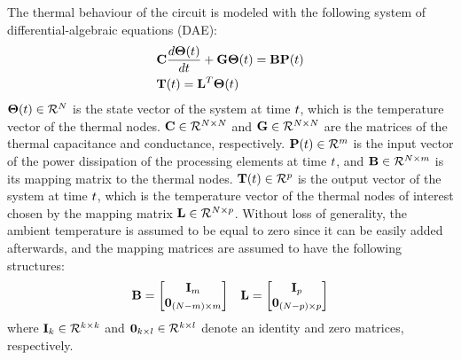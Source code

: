 The thermal behaviour of the circuit is modeled with the following system of differential-algebraic equations (DAE):
\begin{align}
  & \mCap \frac{d\vTemp(\time)}{d\time} + \mCond \vTemp(\time) = \mIn \vPower(\time)  \equlabel{fourier} \\
  & \vOutTemp(\time) = \mOut^T \vTemp(\time) \nonumber
\end{align}
$\mathbf{\Theta}(t) \in \mathcal{R}^{N}$ is the state vector of the system at time $t$, which is the temperature vector of the thermal nodes. $\mathbf{C} \in \mathcal{R}^{N \times N}$ and $\mathbf{G} \in \mathcal{R}^{N \times N}$ are the matrices of the thermal capacitance and conductance, respectively. $\mathbf{P}(t) \in \mathcal{R}^{m}$ is the input vector of the power dissipation of the processing elements at time $t$, and $\mathbf{B} \in \mathcal{R}^{N \times m}$ is its mapping matrix to the thermal nodes. $\mathbf{T}(t) \in \mathcal{R}^{p}$ is the output vector of the system at time $t$, which is the temperature vector of the thermal nodes of interest chosen by the mapping matrix $\mathbf{L} \in \mathcal{R}^{N \times p}$. Without loss of generality, the ambient temperature is assumed to be equal to zero since it can be easily added afterwards, and the mapping matrices are assumed to have the following structures:
\[
  \begin{array}{lr}
  \mathbf{B} = \begin{bmatrix}
    \mathbf{I}_m \\
    \mathbf{0}_{(N - m) \times m}
  \end{bmatrix} &
  \mathbf{L} = \begin{bmatrix}
    \mathbf{I}_p \\
    \mathbf{0}_{(N - p) \times p}
  \end{bmatrix}
  \end{array}
\]
where $\mathbf{I}_k \in \mathcal{R}^{k \times k}$ and $\mathbf{0}_{k \times l} \in \mathcal{R}^{k \times l}$ denote an identity and zero matrices, respectively.

